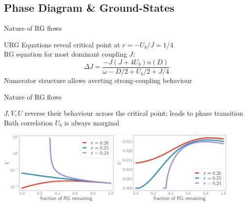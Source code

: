 \documentclass[9pt,aspectratio=169]{beamer}
\begin{document}
\begin{frame}{}
\section{Phase Diagram \& Ground-States}
\end{frame}

\begin{frame}{Nature of RG flows}

\begin{itemize}
	\nitem URG Equations reveal \alert{critical} point at  \(r = -U_b / J = 1/4\)\\[10pt]
	\vspace*{\fill}
	\nitem RG equation for most dominant coupling \(J\):
	\[\Delta J = \frac{-J(J + 4U_b)n(D)}{\omega - D/2 + U_b/2 + J/4}\]
	\vspace*{\fill}
	\nitem Numerator structure allows \alert{averting} strong-coupling behaviour
\end{itemize}

\end{frame}

\begin{frame}{Nature of RG flows}

\begin{itemize}
	\nitem \(J,V,U\) reverse their behaviour across the critical point; leads to \alert{phase transition} \\[20pt]
	\nitem Bath correlation \(U_b\) is always \alert{marginal}
\end{itemize}

\vspace*{\fill}

\includegraphics[width=0.45\textwidth]{V_Ub.pdf}
\hspace*{\fill}
\includegraphics[width=0.45\textwidth]{U_Ub.pdf}

\end{frame}
\end{document}
